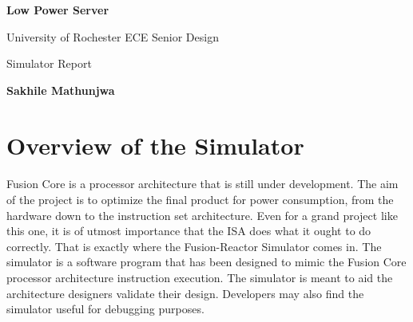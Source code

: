 \documentclass[letterpaper, 11pt, twoside]{article}
\begin{document}
\begin{titlepage}
	\begin{center}

	\vspace*{1cm}
	\Huge
	\textbf{Low Power Server}

	\vspace{0.5cm}
	\LARGE
	University of Rochester ECE Senior Design 

	\vspace{1cm}
	\LARGE
	Simulator Report
	\vspace{1.5cm}
	
	\textbf{Sakhile Mathunjwa} 
	\vfill
	
	
	\end{center}

\end{titlepage}


\cleardoublepage



\tableofcontents
\setcounter{page}{1}
\cleardoublepage

\section[Overview]{Overview of the Simulator} 

\paragraph{} 
\begin{flushleft}
Fusion Core is a processor architecture that is still under development. The aim of the project is to optimize the final product for power consumption, from the hardware down to the instruction set architecture. Even for a grand project like this one, it is of utmost importance that the ISA does what it ought to do correctly. That is exactly where the Fusion-Reactor Simulator comes in. The simulator is a software program that has been designed to mimic the Fusion Core processor architecture instruction execution. The simulator is meant to  aid the architecture designers validate their design. Developers may also find the simulator useful for debugging purposes.
\end{flushleft}
\end{document}
